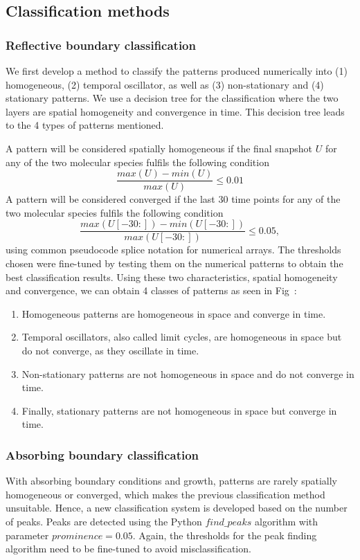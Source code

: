 \documentclass[10pt,letterpaper]{article}
\begin{document}
\subsection*{Classification methods}\label{classification}

\subsubsection*{Reflective boundary classification}\label{numerical_classification1}
We first develop a method to classify the patterns produced numerically into (1) homogeneous, (2) temporal oscillator, as well as (3) non-stationary and (4) stationary patterns.
We use a decision tree for the classification where the two layers are spatial homogeneity and convergence in time.
This decision tree leads to the 4 types of patterns mentioned.

A pattern will be considered spatially homogeneous if the final snapshot $U$ for any of the two molecular species fulfils the following condition
\begin{equation}
    \frac{max(U) - min(U)}{max(U)} \leq 0.01
\end{equation}
A pattern will be considered converged if the last 30 time points for any of the two molecular species fulfils the following condition
\begin{equation}
    \frac{max(U[-30:]) - min(U[-30:])}{max(U[-30:])} \leq 0.05,
\end{equation}
using common pseudocode splice notation for numerical arrays. The thresholds chosen were fine-tuned by testing them on the numerical patterns to obtain the best classification results.
Using these two characteristics, spatial homogeneity and convergence, we can obtain 4 classes of patterns as seen in Fig~:
\begin{enumerate}
    \item Homogeneous patterns are homogeneous in space and converge in time.
    \item Temporal oscillators, also called limit cycles, are homogeneous in space but do not converge, as they oscillate in time.
    \item Non-stationary patterns are not homogeneous in space and do not converge in time.
    \item Finally, stationary patterns are not homogeneous in space but converge in time.
\end{enumerate}
\subsubsection*{Absorbing boundary classification}\label{numerical_classification2}
With absorbing boundary conditions and growth, patterns are rarely spatially homogeneous or converged, which makes the previous classification method unsuitable. Hence, a new classification system is developed based on the number of peaks.
Peaks are detected using the Python $find\_peaks$ algorithm with parameter $prominence=0.05$.
Again, the thresholds for the peak finding algorithm need to be fine-tuned to avoid misclassification.
\end{document}
